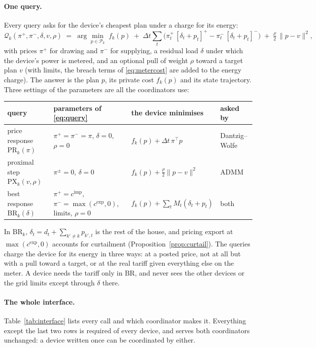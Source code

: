 \documentclass[11pt,a4paper]{article}
\newcommand{\dt}{\Delta t}
\newcommand{\cimp}{c^{\mathrm{imp}}}
\newcommand{\cexp}{c^{\mathrm{exp}}}
\newcommand{\PR}{\mathrm{PR}}
\newcommand{\PX}{\mathrm{PX}}
\newcommand{\BR}{\mathrm{BR}}
\newcommand{\Pk}{\mathcal P_k}
\begin{document}
\paragraph{One query.} Every query asks for the device's cheapest plan under a
charge for its energy:
\begin{equation}
  \mathcal Q_k(\pi^+, \pi^-, \delta, v, \rho) \;=\;
  \arg\min_{p \in \Pk}\; f_k(p)
  \;+\; \dt\sum_t\Big(\pi^+_t\,[\delta_t + p_t]^+ - \pi^-_t\,[\delta_t + p_t]^-\Big)
  \;+\; \tfrac{\rho}{2}\,\|p - v\|^2 ,
  \label{eq:query}
\end{equation}
with prices $\pi^+$ for drawing and $\pi^-$ for supplying, a residual load
$\delta$ under which the device's power is metered, and an optional pull of
weight $\rho$ toward a target plan $v$ (with limits, the breach terms of
\eqref{eq:metercost} are added to the energy charge). The answer is the plan $p$,
its private cost $f_k(p)$ and its state trajectory. Three settings of the
parameters are all the coordinators use:
\begin{center}
\small
\renewcommand{\arraystretch}{1.25}
\begin{tabular}{@{}L{0.19\textwidth}L{0.3\textwidth}L{0.25\textwidth}L{0.17\textwidth}@{}}
\toprule
query & parameters of \eqref{eq:query} & the device minimises & asked by \\
\midrule
price response $\PR_k(\pi)$ & $\pi^+ = \pi^- = \pi$, $\delta = 0$, $\rho = 0$ & $f_k(p) + \dt\,\pi^{\!\top} p$ & Dantzig--Wolfe \\
proximal step $\PX_k(v,\rho)$ & $\pi^\pm = 0$, $\delta = 0$ & $f_k(p) + \tfrac{\rho}{2}\|p - v\|^2$ & ADMM \\
best response $\BR_k(\delta)$ & $\pi^+ = \cimp$, $\pi^- = \max(\cexp, 0)$, limits, $\rho = 0$ & $f_k(p) + \sum_t M_t(\delta_t + p_t)$ & both \\
\bottomrule
\end{tabular}
\end{center}
In $\BR_k$, $\delta_t = d_t + \sum_{k' \ne k} p_{k',t}$ is the rest of the house,
and pricing export at $\max(\cexp, 0)$ accounts for curtailment
(Proposition~\ref{prop:curtail}). The queries charge the device for its energy in
three ways: at a posted price, not at all but with a pull toward a target, or at
the real tariff given everything else on the meter. A device needs the tariff only
in $\BR$, and never sees the other devices or the grid limits except through
$\delta$ there.

\paragraph{The whole interface.} Table~\ref{tab:interface} lists every call and
which coordinator makes it. Everything except the last two rows is required of
every device, and serves both coordinators unchanged: a device written once can be
coordinated by either.
\end{document}
